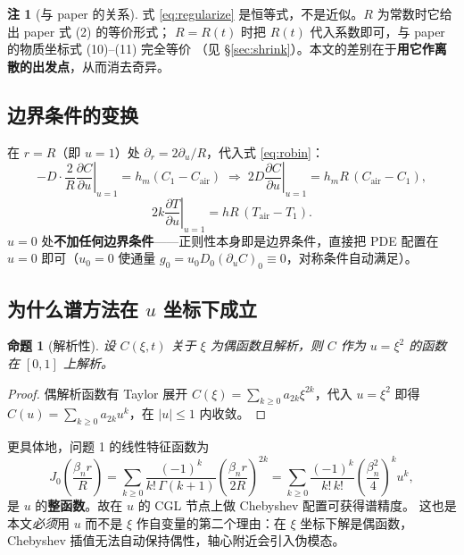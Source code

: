 \documentclass[11pt,a4paper]{article}
\newtheorem{proposition}{命题}
\theoremstyle{definition}
\newtheorem{remark}{注}
\begin{document}
\begin{remark}[与 paper 的关系]
式 \eqref{eq:regularize} 是恒等式，不是近似。$R$ 为常数时它给出 paper 式 (2) 的等价形式；
$R=R(t)$ 时把 $R(t)$ 代入系数即可，与 paper 的物质坐标式 (10)--(11) 完全等价
（见 \S\ref{sec:shrink}）。本文的差别在于\textbf{用它作离散的出发点}，从而消去奇异。
\end{remark}

\subsection{边界条件的变换}

在 $r=R$（即 $u=1$）处 $\partial_r=2\partial_u/R$，代入式 \eqref{eq:robin}：
\begin{equation}
-D\cdot\frac{2}{R}\left.\frac{\partial C}{\partial u}\right|_{u=1}=h_m(C_1-C_{\mathrm{air}})
\;\Longrightarrow\;
2D\left.\frac{\partial C}{\partial u}\right|_{u=1}=h_mR\,(C_{\mathrm{air}}-C_1),
\label{eq:bcC_u}
\end{equation}
\begin{equation}
2k\left.\frac{\partial T}{\partial u}\right|_{u=1}=hR\,(T_{\mathrm{air}}-T_1).
\label{eq:bcT_u}
\end{equation}
$u=0$ 处\textbf{不加任何边界条件}——正则性本身即是边界条件，直接把 PDE 配置在
$u=0$ 即可（$u_0=0$ 使通量 $g_0=u_0D_0(\partial_uC)_0\equiv0$，对称条件自动满足）。

\subsection{为什么谱方法在 $u$ 坐标下成立}

\begin{proposition}[解析性]
设 $C(\xi,t)$ 关于 $\xi$ 为偶函数且解析，则 $C$ 作为 $u=\xi^2$ 的函数在 $[0,1]$ 上解析。
\end{proposition}
\begin{proof}
偶解析函数有 Taylor 展开 $C(\xi)=\sum_{k\ge0}a_{2k}\xi^{2k}$，代入 $u=\xi^2$ 即得
$C(u)=\sum_{k\ge0}a_{2k}u^{k}$，在 $|u|\le1$ 内收敛。
\end{proof}

更具体地，问题 1 的线性特征函数为
\[
J_0\!\left(\frac{\beta_n r}{R}\right)
=\sum_{k\ge0}\frac{(-1)^k}{k!\,\Gamma(k+1)}\left(\frac{\beta_n r}{2R}\right)^{2k}
=\sum_{k\ge0}\frac{(-1)^k}{k!\,k!}\left(\frac{\beta_n^2}{4}\right)^{k}u^{k},
\]
是 $u$ 的\textbf{整函数}。故在 $u$ 的 CGL 节点上做 Chebyshev 配置可获得谱精度。
这也是本文\emph{必须}用 $u$ 而不是 $\xi$ 作自变量的第二个理由：在 $\xi$ 坐标下解是偶函数，
Chebyshev 插值无法自动保持偶性，轴心附近会引入伪模态。
\end{document}
